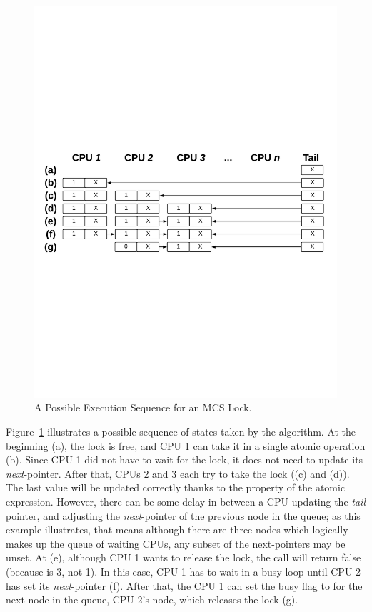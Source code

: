 \begin{figure}
\begin{center}
\includegraphics[width=0.8\linewidth]{figs/mcslock/mcsex}
\end{center}
\caption{A Possible Execution Sequence for an MCS Lock.}
\label{fig:chapter:mcslock:mcs-example}
\end{figure}

Figure~\ref{fig:chapter:mcslock:mcs-example} illustrates a possible sequence of states taken by the algorithm. 
At the beginning (a), the lock is free, and CPU 1 can take it in a single atomic  operation (b).
Since CPU 1 did not have to wait for the lock, it does not need to update its \emph{next}-pointer. 
After that, CPUs 2 and 3 each try to take the lock ((c) and (d)). 
The last value will be updated correctly thanks to the property of the atomic expression.
However, there can be some delay in-between a CPU updating the \emph{tail} pointer, and adjusting the \emph{next}-pointer of the previous node in the queue; as this example illustrates, that means although there are three nodes which logically makes up the queue of waiting CPUs, any subset of the next-pointers may be unset. 
At (e), although CPU 1 wants to release the lock, the 
call will return false (because  is 3, not 1).
In this case, CPU 1 has to wait in a busy-loop until CPU 2 has set its \emph{next}-pointer (f).
After that, the CPU 1 can set the busy flag to  for the next node in the queue, CPU 2's node, which releases the lock (g).

